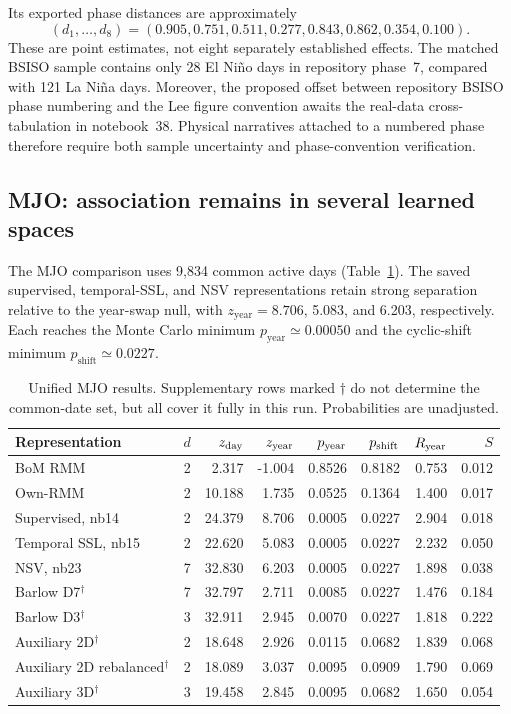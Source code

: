\documentclass[11pt]{article}
\begin{document}
Its exported phase distances are approximately
\begin{equation}
(d_1,\ldots,d_8)=
(0.905,0.751,0.511,0.277,0.843,0.862,0.354,0.100).
\end{equation}
These are point estimates, not eight separately established effects. The matched BSISO sample contains only 28 El Ni\~no days in repository phase~7, compared with 121 La Ni\~na days. Moreover, the proposed offset between repository BSISO phase numbering and the Lee figure convention awaits the real-data cross-tabulation in notebook~38. Physical narratives attached to a numbered phase therefore require both sample uncertainty and phase-convention verification.

\subsection{MJO: association remains in several learned spaces}

The MJO comparison uses 9,834 common active days (Table~\ref{tab:mjo}). The saved supervised, temporal-SSL, and NSV representations retain strong separation relative to the year-swap null, with $z_{\mathrm{year}}=8.706$, 5.083, and 6.203, respectively. Each reaches the Monte Carlo minimum $p_{\mathrm{year}}\simeq0.00050$ and the cyclic-shift minimum $p_{\mathrm{shift}}\simeq0.0227$.

\begin{table}[htbp]
\centering\small
\setlength{\tabcolsep}{4pt}
\caption{Unified MJO results. Supplementary rows marked $\dagger$ do not determine the common-date set, but all cover it fully in this run. Probabilities are unadjusted.}
\label{tab:mjo}
\begin{tabular}{lrrrrrrr}
\toprule
Representation & $d$ & $z_{\rm day}$ & $z_{\rm year}$ & $p_{\rm year}$ & $p_{\rm shift}$ & $R_{\rm year}$ & $S$\\
\midrule
BoM RMM & 2 & 2.317 & -1.004 & 0.8526 & 0.8182 & 0.753 & 0.012\\
Own-RMM & 2 & 10.188 & 1.735 & 0.0525 & 0.1364 & 1.400 & 0.017\\
Supervised, nb14 & 2 & 24.379 & 8.706 & 0.0005 & 0.0227 & 2.904 & 0.018\\
Temporal SSL, nb15 & 2 & 22.620 & 5.083 & 0.0005 & 0.0227 & 2.232 & 0.050\\
NSV, nb23 & 7 & 32.830 & 6.203 & 0.0005 & 0.0227 & 1.898 & 0.038\\
Barlow D7$^\dagger$ & 7 & 32.797 & 2.711 & 0.0085 & 0.0227 & 1.476 & 0.184\\
Barlow D3$^\dagger$ & 3 & 32.911 & 2.945 & 0.0070 & 0.0227 & 1.818 & 0.222\\
Auxiliary 2D$^\dagger$ & 2 & 18.648 & 2.926 & 0.0115 & 0.0682 & 1.839 & 0.068\\
Auxiliary 2D rebalanced$^\dagger$ & 2 & 18.089 & 3.037 & 0.0095 & 0.0909 & 1.790 & 0.069\\
Auxiliary 3D$^\dagger$ & 3 & 19.458 & 2.845 & 0.0095 & 0.0682 & 1.650 & 0.054\\
\bottomrule
\end{tabular}
\end{table}
\end{document}
